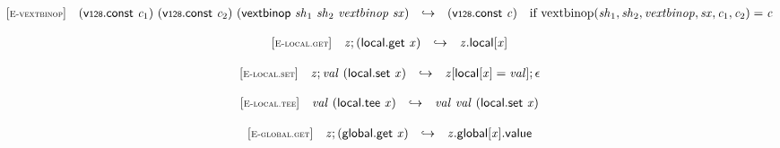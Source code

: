 \vspace{1ex}

$$
\begin{array}{@{}l@{}lcl@{}l@{}}
{[\textsc{\scriptsize E{-}vextbinop}]} \quad & (\mathsf{v{\scriptstyle128}}.\mathsf{const}~{\mathit{c}}_{{1}})~(\mathsf{v{\scriptstyle128}}.\mathsf{const}~{\mathit{c}}_{{2}})~(\mathsf{vextbinop}~{\mathit{sh}}_{{1}}~{\mathit{sh}}_{{2}}~{\mathit{vextbinop}}~{\mathit{sx}}) &\hookrightarrow& (\mathsf{v{\scriptstyle128}}.\mathsf{const}~{\mathit{c}}) &\quad
  \mbox{if}~{\mathrm{vextbinop}}({\mathit{sh}}_{{1}}, {\mathit{sh}}_{{2}}, {\mathit{vextbinop}}, {\mathit{sx}}, {\mathit{c}}_{{1}}, {\mathit{c}}_{{2}}) = {\mathit{c}} \\
\end{array}
$$

\vspace{1ex}

$$
\begin{array}{@{}l@{}lcl@{}l@{}}
{[\textsc{\scriptsize E{-}local.get}]} \quad & {\mathit{z}} ; (\mathsf{local.get}~{\mathit{x}}) &\hookrightarrow& {{\mathit{z}}.\mathsf{local}}{{}[{\mathit{x}}]} &  \\
\end{array}
$$

$$
\begin{array}{@{}l@{}lcl@{}l@{}}
{[\textsc{\scriptsize E{-}local.set}]} \quad & {\mathit{z}} ; {\mathit{val}}~(\mathsf{local.set}~{\mathit{x}}) &\hookrightarrow& {\mathit{z}}{}[\mathsf{local}{}[{\mathit{x}}] = {\mathit{val}}] ; \epsilon &  \\
\end{array}
$$

$$
\begin{array}{@{}l@{}lcl@{}l@{}}
{[\textsc{\scriptsize E{-}local.tee}]} \quad & {\mathit{val}}~(\mathsf{local.tee}~{\mathit{x}}) &\hookrightarrow& {\mathit{val}}~{\mathit{val}}~(\mathsf{local.set}~{\mathit{x}}) &  \\
\end{array}
$$

\vspace{1ex}

$$
\begin{array}{@{}l@{}lcl@{}l@{}}
{[\textsc{\scriptsize E{-}global.get}]} \quad & {\mathit{z}} ; (\mathsf{global.get}~{\mathit{x}}) &\hookrightarrow& {{\mathit{z}}.\mathsf{global}}{{}[{\mathit{x}}]}.\mathsf{value} &  \\
\end{array}
$$


